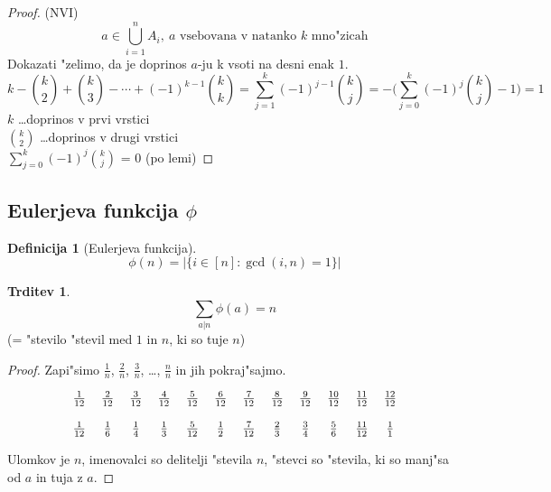 \documentclass[a4paper,12pt]{article}
\theoremstyle{definition}
\newtheorem{defn}[counter]{Definicija}
\newtheorem{claim}[counter]{Trditev}
\theoremstyle{remark}
\begin{document}
\begin{proof}(NVI)
	\label{TODO: tega ne bom gledu}
	\[a \in \bigcup_{i = 1}^{n} A_i,\ a\text{ vsebovana v natanko }k\text{ mno"zicah}\]
	Dokazati "zelimo, da je doprinos $a$-ju k vsoti na desni enak $1$.
	\[k - \binom{k}{2} + \binom{k}{3} - \cdots + (-1)^{k-1} \binom{k}{k} = \sum_{j = 1}^{k} (-1)^{j - 1} \binom{k}{j} = - \bigg(\sum_{j = 0}^{k} (-1)^j \binom{k}{j} - 1\bigg) = 1\]
	$k$ \ldots doprinos v prvi vrstici\\
	$\binom{k}{2}$ \ldots doprinos v drugi vrstici\\
	$\displaystyle \sum_{j = 0}^{k} (-1)^j \binom{k}{j}$ = 0 (po lemi)
\end{proof}

\subsection{Eulerjeva funkcija $\phi$} %
\begin{defn}[Eulerjeva funkcija]
	\[\phi (n) = \big|\{i \in [n] : \gcd(i, n) = 1\}\big|\]
\end{defn}

\begin{claim}
	\[\sum_{a | n} \phi (a) = n\]
	(= "stevilo "stevil med $1$ in $n$, ki so tuje $n$)
\end{claim}

\begin{proof}
	Zapi"simo $\frac{1}{n}$, $\frac{2}{n}$, $\frac{3}{n}$, \ldots, $\frac{n}{n}$ in jih pokraj"sajmo.

	\[
	\begin{tabular}{c c c c c c c c c c c c}

	$\frac{1}{12}$ & $\frac{2}{12}$ & $\frac{3}{12}$ & $\frac{4}{12}$ & $\frac{5}{12}$ & $\frac{6}{12}$ & $\frac{7}{12}$ & $\frac{8}{12}$ & $\frac{9}{12}$ & $\frac{10}{12}$ & $\frac{11}{12}$ & $\frac{12}{12}$\\
	\\
	$\frac{1}{12}$ & $\frac{1}{6}$ & $\frac{1}{4}$ & $\frac{1}{3}$ & $\frac{5}{12}$ & $\frac{1}{2}$ & $\frac{7}{12}$ & $\frac{2}{3}$ & $\frac{3}{4}$ & $\frac{5}{6}$ & $\frac{11}{12}$ & $\frac{1}{1}$

	\end{tabular}
	\]

	Ulomkov je $n$, imenovalci so delitelji "stevila $n$, "stevci so "stevila, ki so manj"sa od $a$ in tuja z $a$.
\end{proof}
\end{document}
